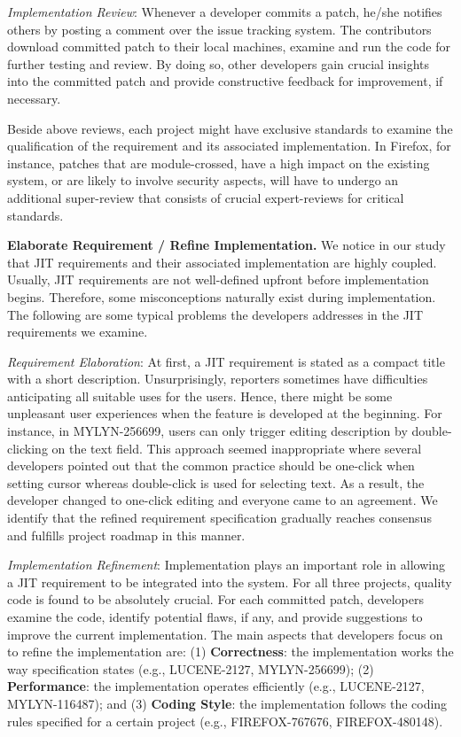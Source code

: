 \documentclass[review]{elsarticle}
\begin{document}
\textit{Implementation Review}: Whenever a developer commits a patch, he/she notifies others by posting a comment over the issue tracking system. The contributors download committed patch to their local machines, examine and run the code for further testing and review. By doing so, other developers gain crucial insights into the committed patch and provide constructive feedback for improvement, if necessary.

Beside above reviews, each project might have exclusive standards to examine the qualification of the requirement and its associated implementation. In Firefox, for instance, patches that are module-crossed, have a high impact on the existing system, or are likely to involve security aspects, will have to undergo an additional super-review that consists of crucial expert-reviews for critical standards.

\textbf{Elaborate Requirement / Refine Implementation.} We notice in our study that JIT requirements and their associated implementation are highly coupled. Usually, JIT requirements are not well-defined upfront before implementation begins. Therefore, some misconceptions naturally exist during implementation. The following are some typical problems the developers addresses in the JIT requirements we examine. 

\textit{Requirement Elaboration}: At first, a JIT requirement is stated as a compact title with a short description. Unsurprisingly, reporters sometimes have difficulties anticipating all suitable uses for the users. Hence, there might be some unpleasant user experiences when the feature is developed at the beginning. For instance, in MYLYN-256699, users can only trigger editing description by double-clicking on the text field. This approach seemed inappropriate where several developers pointed out that the common practice should be one-click when setting cursor whereas double-click is used for selecting text. As a result, the developer changed to one-click editing and everyone came to an agreement. We identify that the refined requirement specification gradually reaches consensus and fulfills project roadmap in this manner.

\textit{Implementation Refinement}: Implementation plays an important role in allowing a JIT requirement to be integrated into the system. For all three projects, quality code is found to be absolutely crucial. For each committed patch, developers examine the code, identify potential flaws, if any, and provide suggestions to improve the current implementation. The main aspects that developers focus on to refine the implementation are: (1) \textbf{Correctness}: the implementation works the way specification states (e.g., LUCENE-2127, MYLYN-256699); (2) \textbf{ Performance}: the implementation operates efficiently (e.g., LUCENE-2127, MYLYN-116487); and (3) \textbf{Coding Style}: the implementation follows the coding rules specified for a certain project (e.g., FIREFOX-767676, FIREFOX-480148).
\end{document}
